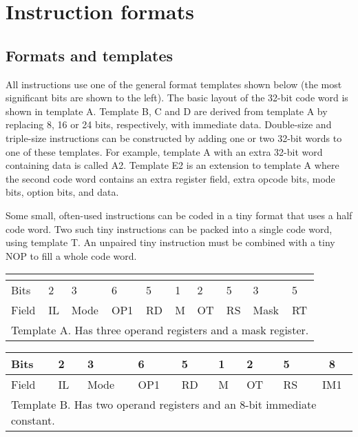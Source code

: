 \documentclass[forwardcom.tex]{subfiles}
\begin{document}
\RaggedRight

\chapter{Instruction formats}
\section{Formats and templates}
All instructions use one of the general format templates shown below (the most significant bits are shown to the left). The basic layout of the 32-bit code word is shown in template A. Template B, C and D are derived from template A by replacing 8, 16 or 24 bits, respectively, with immediate data. Double-size and triple-size instructions can be constructed by adding one or two 32-bit words to one of these templates. For example, template A with an extra 32-bit word containing data is called A2. Template E2 is an extension to template A where the second code word contains an extra register field, extra opcode bits, mode bits, option bits, and data.
\vspace{2mm}

Some small, often-used instructions can be coded in a tiny format that uses a half code word. Two such tiny instructions can be packed into a single code word, using template T. An unpaired tiny instruction must be combined with a tiny NOP to fill a whole code word.

\begin{longtable}[l]
{|p{8mm}|p{8mm}|p{8mm}|p{8mm}|p{8mm}|p{8mm}|p{8mm}|p{8mm}|p{8mm}|p{8mm}|}
\endfirsthead
 \label{table:templateA} \\
\endhead
\hline
 Bits & 2 & 3 & 6 & 5 & 1 & 2 & 5 & 3 & 5 \\
\hline
Field & IL & Mode & OP1 & RD & M & OT & RS & Mask & RT \\
\hline
\multicolumn{10}{|l|}{
Template A. Has three operand registers and a mask register.} \\
\hline
\end{longtable}

\begin{longtable}[l]{|p{8mm}|p{8mm}|p{8mm}|p{8mm}|p{8mm}|p{8mm}|p{8mm}|p{8mm}|p{8mm}|p{16mm}|}
\endfirsthead
\label{table:templateB}
\endhead
\hline
  Bits & 2 & 3 & 6 & 5 & 1 & 2 & 5 & 
  \multicolumn{2}{|c|}{ 8 } \\
\hline
Field & IL & Mode & OP1 & RD & M & OT & RS & 
  \multicolumn{2}{|c|}{ IM1 } \\
\hline
  \multicolumn{10}{|l|}{
Template B. Has two operand registers and an 8-bit immediate constant.}  \\
\hline
\end{longtable}
\end{document}
